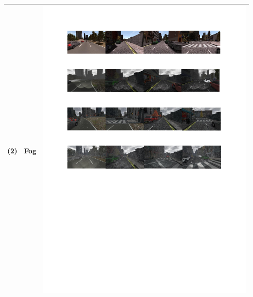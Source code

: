 \begin{table}[!t]
\begin{tabular}{|C{1cm}|c|C{13.5cm}|}
		(2) & Fog	& \begin{minipage}{.9\textwidth}\includegraphics[scale=.8,trim=2cm 20.5cm 2cm 6.5cm,clip]{examples.pdf}\end{minipage} \\ \hline

\end{tabular}
\end{table}
